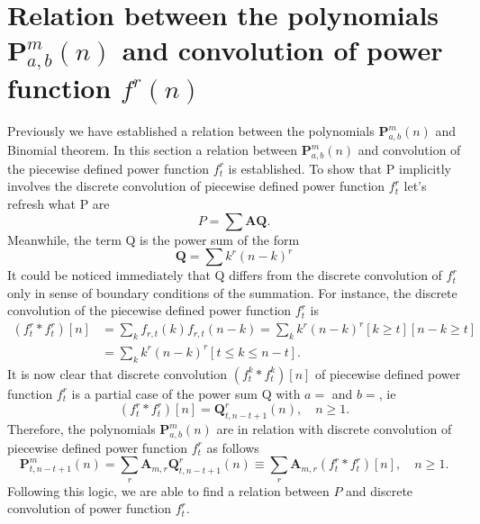 \documentclass[12pt, letterpaper]{amsart}
\theoremstyle{definition}
\theoremstyle{remark}
\numberwithin{equation}{section}
\begin{document}
\section{Relation between the polynomials \texorpdfstring{$\mathbf{P}^{m}_{a,b}(n)$}{Pm[a,b](n)} and convolution of power function \texorpdfstring{$f^r(n)$}{f_r(n)}}
Previously we have established a relation between the polynomials $\mathbf{P}^{m}_{a,b}(n)$ and Binomial theorem. In this section a relation between $\mathbf{P}^{m}_{a,b}(n)$ and convolution of the piecewise defined power function $f_{t}^{r}$ is established. To show that P implicitly involves the discrete convolution of piecewise defined power function $f_{t}^{r}$ let's refresh what P are
\begin{equation*}
P=\sum \mathbf{A Q}.
\end{equation*}
Meanwhile, the term Q is the power sum of the form
\begin{equation*}
\mathbf{Q} = \sum k^r (n-k)^r
\end{equation*}
It could be noticed immediately that Q differs from the discrete convolution of $f_{t}^{r}$ only in sense of boundary conditions of the summation. For instance, the discrete convolution of the piecewise defined power function $f_{t}^{r}$ is
\begin{equation*}
\begin{split}
(f_{t}^{r} \ast f_{t}^{r})[n]
&= \sum_{k}f_{r,t}(k)f_{r,t}(n-k) = \sum_{k}k^r(n-k)^r[k\geq t][n-k\geq t] \\
&= \sum_{k}k^r(n-k)^r[t\leq k \leq n-t].
\end{split}
\end{equation*}
It is now clear that discrete convolution $(f_{t}^{k} \ast f_{t}^{k})[n]$ of piecewise defined power function $f_{t}^{r}$ is a partial case of the power sum Q with $a=$ and $b=$, ie
\begin{equation*}
(f_{t}^{r} \ast f_{t}^{r})[n]  = \mathbf{Q}_{t,n-t+1}^r(n), \quad n\geq 1.
\end{equation*}
Therefore, the polynomials $\mathbf{P}^{m}_{a,b}(n)$ are in relation with discrete convolution of piecewise defined power function $f_{t}^{r}$ as follows
\begin{equation*}
\mathbf{P}^{m}_{t,n-t+1}(n)
=\sum\limits_{r}\mathbf{A}_{m,r} \mathbf{Q}_{t,n-t+1}^r(n)
\equiv \sum\limits_{r}\mathbf{A}_{m,r} (f_{t}^{r} \ast f_{t}^{r})[n], \quad n\geq 1.
\end{equation*}
Following this logic, we are able to find a relation between $P$ and discrete convolution of power function \texorpdfstring{$f_{t}^{r}$}{fr(n)}.
\end{document}
